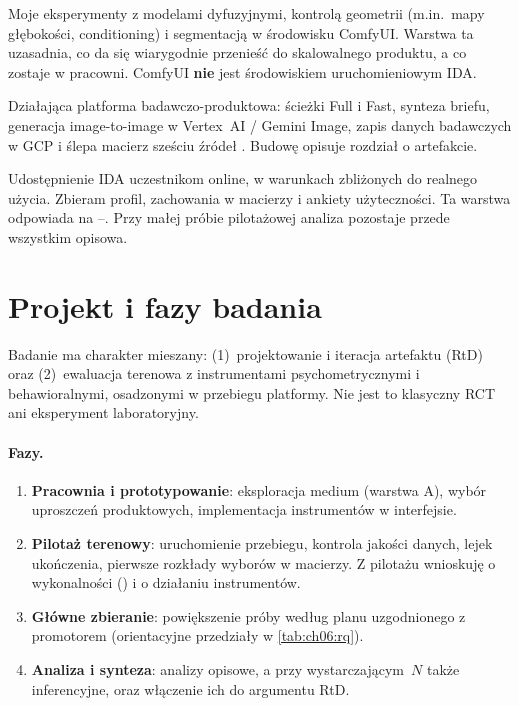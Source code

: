 \begin{description}[style=nextline]
  \item[(A) Praktyka pracowni / ComfyUI]
  Moje eksperymenty z modelami dyfuzyjnymi, kontrolą geometrii (m.in.\ mapy głębokości, conditioning) i segmentacją w środowisku ComfyUI. Warstwa ta uzasadnia, co da się wiarygodnie przenieść do skalowalnego produktu, a co zostaje w pracowni. ComfyUI \textbf{nie} jest środowiskiem uruchomieniowym IDA.

  \item[(B) Artefakt IDA]
  Działająca platforma badawczo-produktowa: ścieżki Full i Fast, synteza briefu, generacja image-to-image w Vertex~AI / Gemini Image, zapis danych badawczych w GCP i ślepa macierz sześciu źródeł \parencite{idaPlatform2026}. Budowę opisuje rozdział o artefakcie.

  \item[(C) Ewaluacja terenowa]
  Udostępnienie IDA uczestnikom online, w warunkach zbliżonych do realnego użycia. Zbieram profil, zachowania w macierzy i ankiety użyteczności. Ta warstwa odpowiada na --. Przy małej próbie pilotażowej analiza pozostaje przede wszystkim opisowa.
\end{description}

\section{Projekt i fazy badania}
\label{ch06:sec:projekt}

Badanie ma charakter mieszany: (1)~projektowanie i iteracja artefaktu (RtD) oraz (2)~ewaluacja terenowa z instrumentami psychometrycznymi i behawioralnymi, osadzonymi w przebiegu platformy. Nie jest to klasyczny RCT ani eksperyment laboratoryjny.

\paragraph{Fazy.}
\begin{enumerate}
  \item \textbf{Pracownia i prototypowanie}: eksploracja medium (warstwa A), wybór uproszczeń produktowych, implementacja instrumentów w interfejsie.
  \item \textbf{Pilotaż terenowy}: uruchomienie przebiegu, kontrola jakości danych, lejek ukończenia, pierwsze rozkłady wyborów w macierzy. Z pilotażu wnioskuję o wykonalności () i o działaniu instrumentów.
  \item \textbf{Główne zbieranie}: powiększenie próby według planu uzgodnionego z promotorem (orientacyjne przedziały w \cref{tab:ch06:rq}).
  \item \textbf{Analiza i synteza}: analizy opisowe, a przy wystarczającym~$N$ także inferencyjne, oraz włączenie ich do argumentu RtD.
\end{enumerate}

